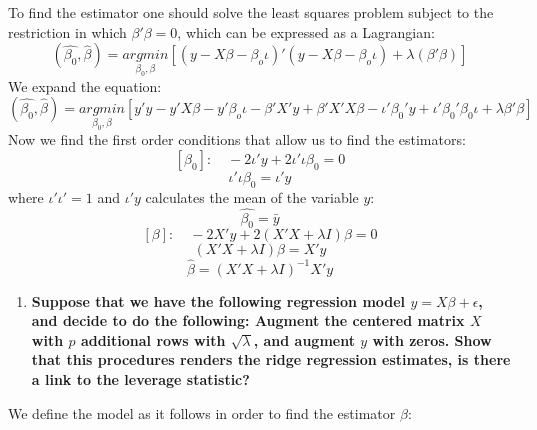 \documentclass[12pt,onecolumn]{article}
\begin{document}
\\
\\
To find the estimator one should solve the least squares problem subject to the restriction in which $\beta'\beta=0$, which can be expressed as a Lagrangian:
\begin{equation*}
    \left(\hat{\beta_0},\hat{\beta}\right)=\underset{\beta_0,\beta}{argmin} \left[(y-X\beta-\beta_o\iota)'(y-X\beta-\beta_o\iota)+\lambda(\beta'\beta)\right]
\end{equation*}
We expand the equation:
\begin{equation*}
    \left(\hat{\beta_0},\hat{\beta}\right)=\underset{\beta_0,\beta}{argmin}\left[y'y-y'X\beta-y'\beta_o\iota-\beta'X'y+\beta'X'X\beta-\iota'\beta_0'y+\iota'\beta_0'\beta_0\iota+\lambda\beta'\beta\right]
\end{equation*}
Now we find the first order conditions that allow us to find the estimators:
\begin{equation*}
    \left[\beta_0\right]: \quad -2\iota'y+2\iota'\iota\beta_0=0
\end{equation*}
\begin{equation*}
    \iota'\iota\beta_0=\iota'y
\end{equation*}
where $\iota'\iota'=1$ and $\iota'y$ calculates the mean of the variable $y$:
\begin{equation*}
    \hat{\beta_0}=\bar{y}
\end{equation*}
\begin{equation*}
    \left[\beta\right]: \quad -2X'y+2(X'X+\lambda{I})\beta=0
\end{equation*}
\begin{equation*}
    (X'X+\lambda{I})\beta=X'y
\end{equation*}
\begin{equation*}
    \hat{\beta}=(X'X+\lambda{I})^{-1}X'y
\end{equation*}
\begin{enumerate}[resume]  
    \item \bf{Suppose that we have the following regression model  $y=X\beta +\epsilon$, and decide to do the following: Augment the centered matrix $X$ with $p$ additional rows with $\sqrt{\lambda}$, and augment $y$ with zeros. Show that this procedures renders the ridge regression estimates, is there a link to the leverage statistic?}
\end{enumerate}

We define the model as it follows in order to find the estimator $\beta$:
\end{document}
